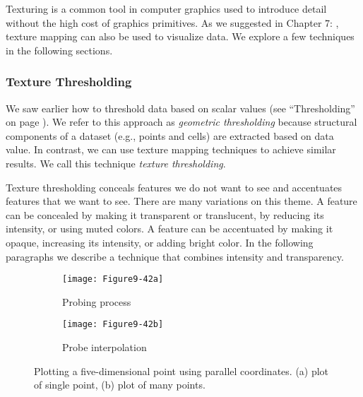 Texturing is a common tool in computer graphics used to introduce detail without the high cost of graphics primitives. As we suggested in Chapter 7: , texture mapping can also be used to visualize data. We explore a few techniques in the following sections.

\subsubsection{Texture Thresholding}

We saw earlier how to threshold data based on scalar values (see ``Thresholding'' on page \pageref{subsubsec:thresholding}). We refer to this approach as \emph{geometric thresholding} because structural components of a dataset (e.g., points and cells) are extracted based on data value. In contrast, we can use texture mapping techniques to achieve similar results. We call this technique \emph{texture thresholding}.

Texture thresholding conceals features we do not want to see and accentuates features that we want to see. There are many variations on this theme. A feature can be concealed by making it transparent or translucent, by reducing its intensity, or using muted colors. A feature can be accentuated by making it opaque, increasing its intensity, or adding bright color. In the following paragraphs we describe a technique that combines intensity and transparency.

\begin{figure}[htb]
	\begin{subfigure}[h]{0.48\linewidth}
		\texttt{[image: Figure9-42a]}
		\captionsetup{justification=centering}
		\caption{Probing process}
		\label{fig:Figure9-42a}
	\end{subfigure}
	\hfill
	\begin{subfigure}[h]{0.48\linewidth}
		\texttt{[image: Figure9-42b]}
		\captionsetup{justification=centering}
		\caption{Probe interpolation}
		\label{fig:Figure9-42b}
	\end{subfigure}
	\caption{Plotting a five-dimensional point using parallel coordinates. (a) plot of single point, (b) plot of many points.}\label{fig:Figure9-42}
\end{figure}

